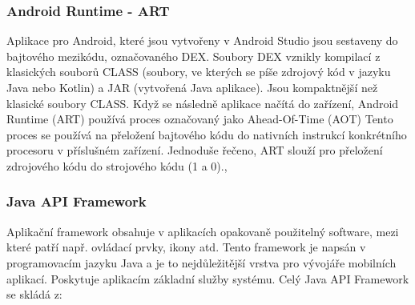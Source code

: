 \documentclass{vskpou} %
\begin{document}
\subsubsection{Android Runtime - ART}
Aplikace pro Android, které jsou vytvořeny v Android Studio jsou sestaveny do bajtového mezikódu, označovaného DEX. Soubory DEX vznikly kompilací z klasických souborů CLASS (soubory, ve kterých se píše zdrojový kód v jazyku Java nebo Kotlin) a JAR (vytvořená Java aplikace). Jsou kompaktnější než klasické soubory CLASS. Když se následně aplikace načítá do zařízení, Android Runtime (ART) používá proces označovaný jako Ahead-Of-Time (AOT) Tento proces se používá na přeložení bajtového kódu do nativních instrukcí konkrétního procesoru v příslušném zařízení. Jednoduše řečeno, ART slouží pro přeložení zdrojového kódu do strojového kódu (1 a 0).\cite{10},\cite{17} 

\subsubsection{Java API Framework}
Aplikační framework obsahuje v aplikacích opakovaně použitelný software, mezi které patří např. ovládací prvky, ikony atd. Tento framework je napsán v programovacím jazyku Java a je to nejdůležitější vrstva pro vývojáře mobilních aplikací. Poskytuje aplikacím základní služby systému. Celý Java API Framework se skládá z:\cite{17}
\end{document}
